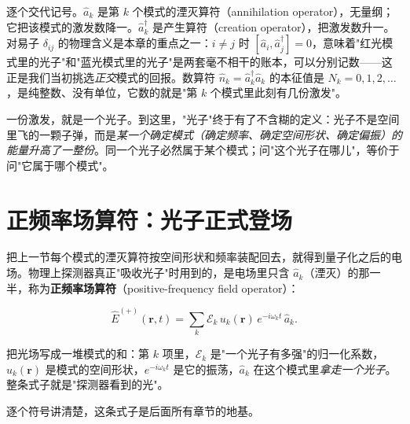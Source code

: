 逐个交代记号。\(\hat a_k\) 是第 \(k\) 个模式的湮灭算符（annihilation operator），无量纲；它把该模式的激发数降一。\(\hat a_k^\dagger\) 是产生算符（creation operator），把激发数升一。对易子 \(\delta_{ij}\) 的物理含义是本章的重点之一：\(i\neq j\) 时 \([\hat a_i,\hat a_j^\dagger]=0\)，意味着"红光模式里的光子"和"蓝光模式里的光子"是两套毫不相干的账本，可以分别记数——这正是我们当初挑选\emph{正交}模式的回报。数算符 \(\hat n_k=\hat a_k^\dagger\hat a_k\) 的本征值是 \(N_k=0,1,2,\dots\)，是纯整数、没有单位，它数的就是"第 \(k\) 个模式里此刻有几份激发"。

一份激发，就是一个光子。到这里，"光子"终于有了不含糊的定义：光子不是空间里飞的一颗子弹，而是\emph{某一个确定模式（确定频率、确定空间形状、确定偏振）的能量升高了一整份}。同一个光子必然属于某个模式；问"这个光子在哪儿"，等价于问"它属于哪个模式"。

\section{正频率场算符：光子正式登场}
\label{sec:e05-field-operator}

把上一节每个模式的湮灭算符按空间形状和频率装配回去，就得到量子化之后的电场。物理上探测器真正"吸收光子"时用到的，是电场里只含 \(\hat a_k\)（湮灭）的那一半，称为\textbf{正频率场算符}（positive-frequency field operator）：

\begin{equation}
  \hat E^{(+)}(\bm r,t)=\sum_k \mathcal E_k\,u_k(\bm r)\,e^{-i\omega_k t}\,\hat a_k .
  \label{eq:e05-field-expansion}
\end{equation}
\begin{formulaexplain}
把光场写成一堆模式的和：第 \(k\) 项里，\(\mathcal E_k\) 是"一个光子有多强"的归一化系数，\(u_k(\bm r)\) 是模式的空间形状，\(e^{-i\omega_k t}\) 是它的振荡，\(\hat a_k\) 在这个模式里\emph{拿走一个光子}。整条式子就是"探测器看到的光"。
\end{formulaexplain}

逐个符号讲清楚，这条式子是后面所有章节的地基。

